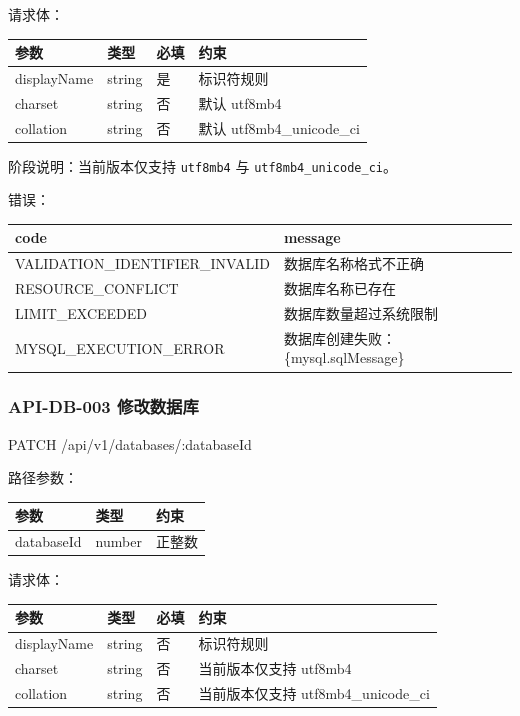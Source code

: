 \documentclass[
  a4paper,
  UTF8]{ctexart}
\newenvironment{Shaded}{}{}
\newcommand{\NormalTok}[1]{#1}
\begin{document}
请求体：

\begin{longtable}[]{@{}llll@{}}
\toprule
参数 & 类型 & 必填 & 约束 \\
\midrule
\endhead
displayName & string & 是 & 标识符规则 \\
charset & string & 否 & 默认 utf8mb4 \\
collation & string & 否 & 默认 utf8mb4\_unicode\_ci \\
\bottomrule
\end{longtable}

阶段说明：当前版本仅支持 \texttt{utf8mb4} 与
\texttt{utf8mb4\_unicode\_ci}。

错误：

\begin{longtable}[]{@{}ll@{}}
\toprule
code & message \\
\midrule
\endhead
VALIDATION\_IDENTIFIER\_INVALID & 数据库名称格式不正确 \\
RESOURCE\_CONFLICT & 数据库名称已存在 \\
LIMIT\_EXCEEDED & 数据库数量超过系统限制 \\
MYSQL\_EXECUTION\_ERROR & 数据库创建失败：\{mysql.sqlMessage\} \\
\bottomrule
\end{longtable}

\hypertarget{api-db-003-ux4feeux6539ux6570ux636eux5e93}{%
\subsubsection{API-DB-003
修改数据库}\label{api-db-003-ux4feeux6539ux6570ux636eux5e93}}

\begin{Shaded}
\begin{Highlighting}[]
\NormalTok{PATCH /api/v1/databases/:databaseId}
\end{Highlighting}
\end{Shaded}

路径参数：

\begin{longtable}[]{@{}lll@{}}
\toprule
参数 & 类型 & 约束 \\
\midrule
\endhead
databaseId & number & 正整数 \\
\bottomrule
\end{longtable}

请求体：

\begin{longtable}[]{@{}llll@{}}
\toprule
参数 & 类型 & 必填 & 约束 \\
\midrule
\endhead
displayName & string & 否 & 标识符规则 \\
charset & string & 否 & 当前版本仅支持 utf8mb4 \\
collation & string & 否 & 当前版本仅支持 utf8mb4\_unicode\_ci \\
\bottomrule
\end{longtable}
\end{document}

